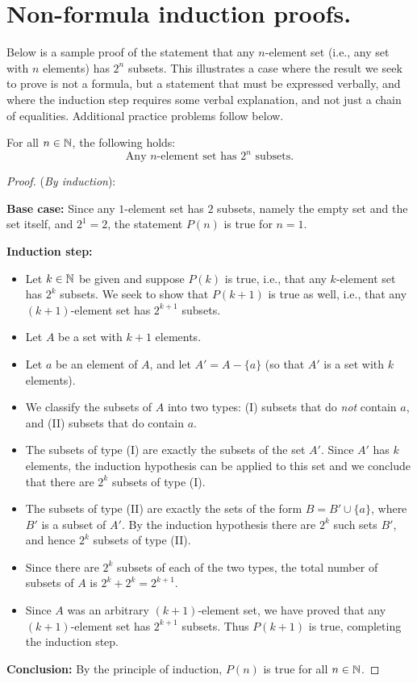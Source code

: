 \section{Non-formula induction proofs.}
Below is a sample proof of the statement that any $n$-element set (i.e.,
any set with $n$ elements) has $2^n$ subsets. 
This illustrates a case where the result we seek to prove is not a
formula, but a statement that must be expressed verbally, and where the
induction step requires some verbal explanation, and not just a chain of
equalities.  Additional practice  problems follow below.


\begin{prop}
For all $n\in\mathbb{N}$, the following holds:
\[
{\text{Any $n$-element set has $2^n$ subsets.}}
\tag{$P(n)$}
\]
\end{prop}
\begin{proof}(\emph{By induction}):

\textbf{Base case:} Since any $1$-element set has $2$
subsets, namely the empty set and the set itself,
and $2^1=2$, the statement $P(n)$ is true for $n=1$.

\textbf{Induction step:} 
\begin{itemize}
\item 
Let $k\in\mathbb{N}$ be given and suppose 
$P(k)$ is true, i.e., that any $k$-element set has $2^k$ subsets.
We seek to show that $P(k+1)$  is true as well,
i.e., that any $(k+1)$-element set has $2^{k+1}$ subsets.

\item 
Let $A$ be a set with $k+1$ elements.  

\item 
Let $a$ be an element of $A$, and let $A'=A-\{a\}$ (so that   
$A'$ is a set with $k$ elements).

\item 
We classify the subsets of $A$ into two types: (I) subsets that do
\emph{not} contain $a$, and (II) subsets that do contain $a$.

\item 
The subsets of type (I) are exactly the subsets of the set
$A'$. Since $A'$ has $k$ elements, the induction
hypothesis can be applied to this set and we conclude that there are $2^k$
subsets of type (I).

\item 
The subsets of type (II) are exactly the sets of the form $B=B'\cup
\{a\}$, where $B'$ is a subset of $A'$.
By the induction hypothesis there are $2^k$ such sets $B'$, and hence
$2^k$ subsets of type (II).

\item 
Since there are $2^k$ subsets of each of the two types, the total number
of subsets of  $A$ is $2^k+2^k=2^{k+1}$. 

\item 
Since $A$ was an arbitrary $(k+1)$-element set, we have proved that any
$(k+1)$-element set has $2^{k+1}$ subsets.
Thus $P(k+1)$ is true, completing the induction step. 
\end{itemize}

\textbf{Conclusion:} By the principle of induction, 
$P(n)$  is true for all $n\in\mathbb{N}$.
\end{proof}

